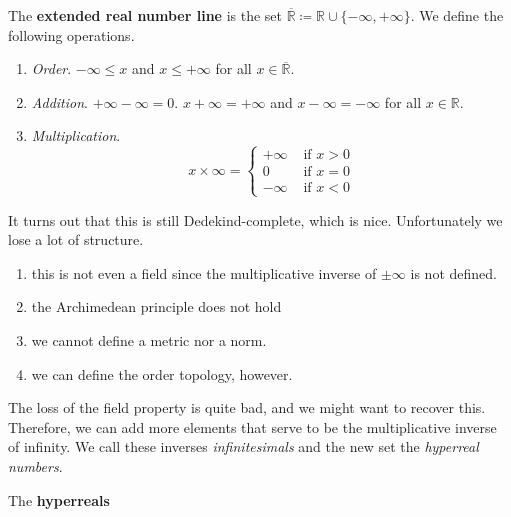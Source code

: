 \documentclass{article}
\begin{document}
    \begin{theorem}
      The \textbf{extended real number line} is the set $\overline{\mathbb{R}} \coloneqq \mathbb{R} \cup \{-\infty, +\infty\}$. We define the following operations. 
      \begin{enumerate}
        \item \textit{Order}. $-\infty \leq x$ and $x \leq +\infty$ for all $x \in \overline{\mathbb{R}}$. 
        \item \textit{Addition}. $+\infty - \infty = 0$. $x + \infty = +\infty$ and $x - \infty = -\infty$ for all $x \in \mathbb{R}$. 
        \item \textit{Multiplication}. 
        \begin{equation}
          x \times \infty = \begin{cases} +\infty & \text{ if } x > 0 \\ 0 & \text{ if } x = 0 \\ -\infty & \text{ if } x < 0 \end{cases}
        \end{equation}
      \end{enumerate}
      It turns out that this is still Dedekind-complete, which is nice. Unfortunately we lose a lot of structure. 
      \begin{enumerate}
        \item this is not even a field since the multiplicative inverse of $\pm \infty$ is not defined. 
        \item the Archimedean principle does not hold 
        \item we cannot define a metric nor a norm. 
        \item we can define the order topology, however. 
      \end{enumerate}
    \end{theorem} 

    The loss of the field property is quite bad, and we might want to recover this. Therefore, we can add more elements that serve to be the multiplicative inverse of infinity. We call these inverses \textit{infinitesimals} and the new set the \textit{hyperreal numbers}. 

    \begin{theorem}[Hyperreals]
      The \textbf{hyperreals} 
    \end{theorem}
\end{document}

